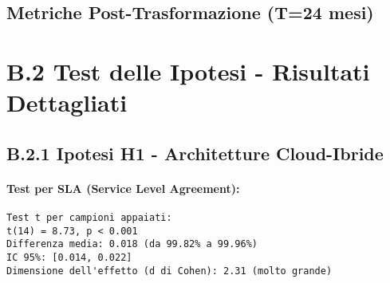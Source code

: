 \subsection{Metriche Post-Trasformazione (T=24 mesi)}

\begin{table}[htbp]
\centering
\caption{Metriche GIST post-trasformazione e variazioni percentuali}
\label{tab:metriche_post}
\end{table}

\section{B.2 Test delle Ipotesi - Risultati Dettagliati}

\subsection{B.2.1 Ipotesi H1 - Architetture Cloud-Ibride}

\paragraph{Test per SLA (Service Level Agreement):}
\begin{lstlisting}[basicstyle=\small\ttfamily]
Test t per campioni appaiati:
t(14) = 8.73, p < 0.001
Differenza media: 0.018 (da 99.82% a 99.96%)
IC 95%: [0.014, 0.022]
Dimensione dell'effetto (d di Cohen): 2.31 (molto grande)
\end{lstlisting}

